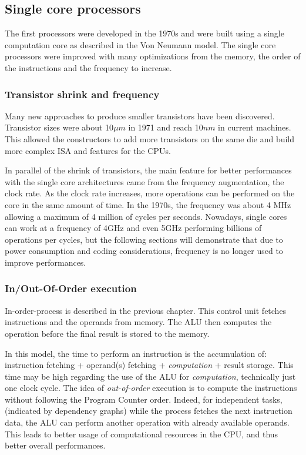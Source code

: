 \subsection{Single core processors}
The first processors were developed in the 1970s and were built using a single computation core as described in the Von Neumann model. 
The single core processors were improved with many optimizations from the memory, the order of the instructions and the frequency to increase.

\subsubsection{Transistor shrink and frequency}
Many new approaches to produce smaller transistors have been discovered.
Transistor sizes were about 10$\mu m$ in 1971 and reach 10$nm$ in current machines.
This allowed the constructors to add more transistors on the same die and build more complex ISA and features for the CPUs. 

In parallel of the shrink of transistors, the main feature for better performances with the single core architectures came from the frequency augmentation, the clock rate. 
As the clock rate increases, more operations can be performed on the core in the same amount of time. 
In the 1970s, the frequency was about 4 MHz allowing a maximum of 4 million of cycles per seconds. 
Nowadays, single cores can work at a frequency of 4GHz and even 5GHz performing billions of operations per cycles, but the following sections will demonstrate that due to power consumption and coding considerations, frequency is no longer used to improve performances. 

\subsubsection{In/Out-Of-Order execution} 
In-order-process is described in the previous chapter. 
This control unit fetches instructions and the operands from memory. 
The ALU then computes the operation before the final result is stored to the memory.

In this model, the time to perform an instruction is the accumulation of: instruction fetching + operand(s) fetching + \textit{computation} + result storage.
This time may be high regarding the use of the ALU for \textit{computation}, technically just one clock cycle. 
The idea of \textit{out-of-order} execution is to compute the instructions without following the Program Counter order. 
Indeed, for independent tasks, (indicated by dependency graphs) while the process fetches the next instruction data, the ALU can perform another operation with already available operands.
This leads to better usage of computational resources in the CPU, and thus better overall performances. 

